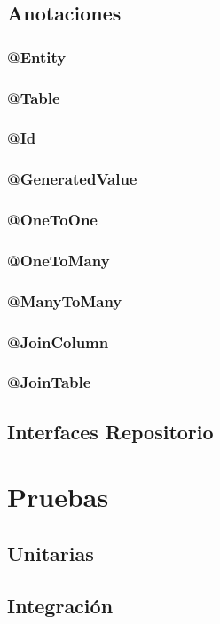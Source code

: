 \documentclass[12pt,article,oneside]{memoir}
\begin{document}
			\subsection{Anotaciones}
				\subsubsection{ @Entity }
				\subsubsection{ @Table }
				\subsubsection{ @Id }
				\subsubsection{ @GeneratedValue }
				\subsubsection{ @OneToOne }
				\subsubsection{ @OneToMany }
				\subsubsection{ @ManyToMany }
				\subsubsection{ @JoinColumn }
				\subsubsection{ @JoinTable }
	\newpage
			\subsection{Interfaces Repositorio}
	\newpage
		\section{Pruebas}
			\subsection{Unitarias}
			\subsection{Integraci\'on}
	\newpage
\end{document}
